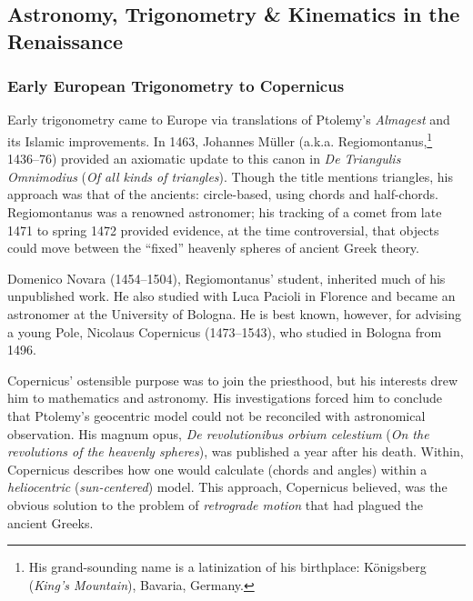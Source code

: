 


\subsection{Astronomy, Trigonometry \& Kinematics in the Renaissance}

\subsubsection*{Early European Trigonometry to Copernicus}

Early trigonometry came to Europe via translations of Ptolemy's \emph{Almagest} and its Islamic improvements. In 1463, Johannes Müller (a.k.a.{} Regiomontanus,\footnote{%
	His grand-sounding name is a latinization of his birthplace: Königsberg (\emph{King's Mountain}), Bavaria, Germany.%
} 1436--76) provided an axiomatic update to this canon in \emph{De Triangulis Omnimodius} (\emph{Of all kinds of triangles}). Though the title mentions triangles, his approach was that of the ancients: circle-based, using chords and half-chords. Regiomontanus was a renowned astronomer; his tracking of a comet from late 1471 to spring 1472 provided evidence, at the time controversial, that objects could move between the ``fixed'' heavenly spheres of ancient Greek theory.
\smallbreak

Domenico Novara (1454--1504), Regiomontanus' student, inherited much of his unpublished work. He also studied with Luca Pacioli in Florence and became an astronomer at the University of Bologna. He is best known, however, for advising a young Pole, Nicolaus Copernicus (1473--1543), who studied in Bologna from 1496.\smallbreak

Copernicus' ostensible purpose was to join the priesthood, but his interests drew him to mathematics and astronomy. His investigations forced him to conclude that Ptolemy's geocentric model could not be reconciled with astronomical observation. His magnum opus, \emph{De revolutionibus orbium celestium} (\emph{On the revolutions of the heavenly spheres}), was published a year after his death. Within, Copernicus describes how one would calculate (chords and angles) within a \emph{heliocentric} (\emph{sun-centered}) model. This approach, Copernicus believed, was the obvious solution to the problem of \emph{retrograde motion} that had plagued the ancient Greeks.\footnotemark{}\par

